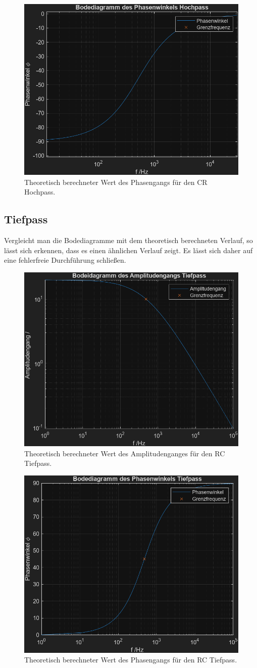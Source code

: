 \documentclass[12pt,a4paper,twoside]{article}
\begin{document}
\begin{figure}[H]
    \centering
    \includegraphics[width=0.6\linewidth]{Matlab/1 ph.png}
    \caption{Theoretisch berechneter Wert des Phasengangs für den CR Hochpass.}
    \label{fig:disk 1 ph} 
\end{figure}

\subsection{Tiefpass}
Vergleicht man die Bodediagramme mit dem theoretisch berechneten Verlauf, so lässt sich erkennen, dass es einen ähnlichen Verlauf zeigt. 
Es lässt sich daher auf eine fehlerfreie Durchführung schließen. 

\begin{figure}[H]
    \centering
    \includegraphics[width=0.6\linewidth]{Matlab/2 amp.png}
    \caption{Theoretisch berechneter Wert des Amplitudenganges für den RC Tiefpass.}
    \label{fig:disk 2 amp} 
\end{figure}

\begin{figure}[H]
    \centering
    \includegraphics[width=0.6\linewidth]{Matlab/2 ph.png}
    \caption{Theoretisch berechneter Wert des Phasengangs für den RC Tiefpass.}
    \label{fig:disk 2 ph} 
\end{figure}
\end{document}
